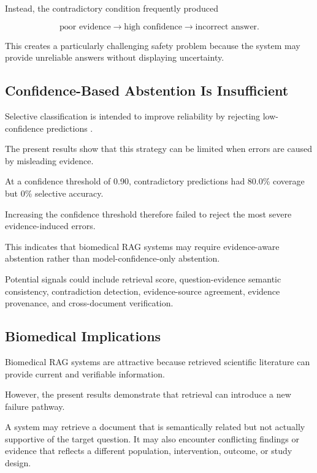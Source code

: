 \documentclass[conference]{IEEEtran}
\begin{document}
Instead, the contradictory condition frequently produced

\begin{equation}
\text{poor evidence}
\rightarrow
\text{high confidence}
\rightarrow
\text{incorrect answer}.
\end{equation}

This creates a particularly challenging safety problem because the system may provide unreliable answers without displaying uncertainty.

\subsection{Confidence-Based Abstention Is Insufficient}

Selective classification is intended to improve reliability by rejecting low-confidence predictions \cite{geifman2017selective}.

The present results show that this strategy can be limited when errors are caused by misleading evidence.

At a confidence threshold of 0.90, contradictory predictions had 80.0\% coverage but 0\% selective accuracy.

Increasing the confidence threshold therefore failed to reject the most severe evidence-induced errors.

This indicates that biomedical RAG systems may require evidence-aware abstention rather than model-confidence-only abstention.

Potential signals could include retrieval score, question-evidence semantic consistency, contradiction detection, evidence-source agreement, evidence provenance, and cross-document verification.

\subsection{Biomedical Implications}

Biomedical RAG systems are attractive because retrieved scientific literature can provide current and verifiable information.

However, the present results demonstrate that retrieval can introduce a new failure pathway.

A system may retrieve a document that is semantically related but not actually supportive of the target question. It may also encounter conflicting findings or evidence that reflects a different population, intervention, outcome, or study design.
\end{document}
